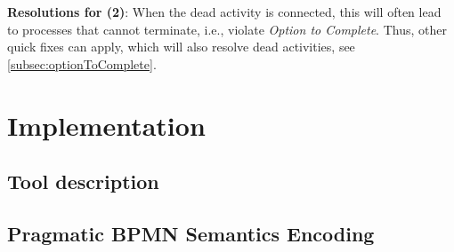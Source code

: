 \documentclass[runningheads]{llncs}
\begin{document}
\textbf{Resolutions for (2)}: When the dead activity is connected, this will often lead to processes that cannot terminate, i.e., violate \textit{Option to Complete}.
Thus, other quick fixes can apply, which will also resolve dead activities, see \autoref{subsec:optionToComplete}.

\section{Implementation}


\subsection{Tool description}



\subsection{Pragmatic BPMN Semantics Encoding}
\end{document}
